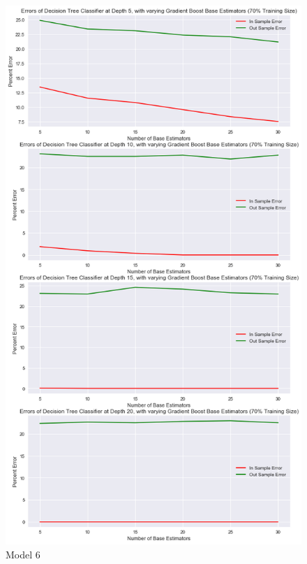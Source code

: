 \documentclass[10pt,twocolumn]{article}
\begin{document}
\begin{table}[ht]
\begin{figure}[!t]
  \begin{center}
    \includegraphics[width=\textwidth,height=\textheight,keepaspectratio]{gradient_boost.png}
  \end{center}

  \caption{\small Model 6}
  \label{fig-1}
\end{figure}


\end{table}
\end{document}
